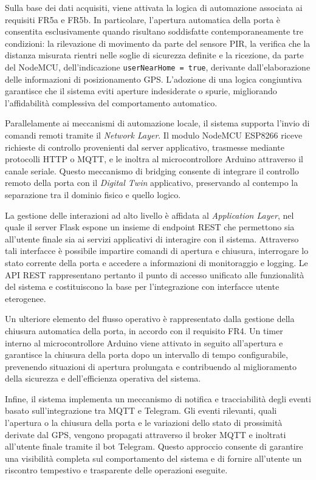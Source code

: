 Sulla base dei dati acquisiti, viene attivata la logica di automazione
associata ai requisiti FR5a e FR5b. In particolare, l’apertura automatica della
porta è consentita esclusivamente quando risultano soddisfatte
contemporaneamente tre condizioni: la rilevazione di movimento da parte del
sensore PIR, la verifica che la distanza misurata rientri nelle soglie di
sicurezza definite e la ricezione, da parte del NodeMCU, dell’indicazione
\texttt{userNearHome = true}, derivante dall’elaborazione delle informazioni di
posizionamento GPS. L’adozione di una logica congiuntiva garantisce che il
sistema eviti aperture indesiderate o spurie, migliorando l’affidabilità
complessiva del comportamento automatico.

Parallelamente ai meccanismi di automazione locale, il sistema supporta
l’invio di comandi remoti tramite il \textit{Network Layer}. Il modulo NodeMCU
ESP8266 riceve richieste di controllo provenienti dal server applicativo,
trasmesse mediante protocolli HTTP o MQTT, e le inoltra al microcontrollore
Arduino attraverso il canale seriale. Questo meccanismo di bridging consente di
integrare il controllo remoto della porta con il \textit{Digital Twin}
applicativo, preservando al contempo la separazione tra il dominio fisico e
quello logico.

La gestione delle interazioni ad alto livello è affidata al \textit{Application
Layer}, nel quale il server Flask espone un insieme di endpoint REST che
permettono sia all’utente finale sia ai servizi applicativi di interagire con il
sistema. Attraverso tali interfacce è possibile impartire comandi di
apertura e chiusura, interrogare lo stato corrente della porta e accedere a
informazioni di monitoraggio e logging. Le API REST rappresentano pertanto il
punto di accesso unificato alle funzionalità del sistema e costituiscono la
base per l’integrazione con interfacce utente eterogenee.

Un ulteriore elemento del flusso operativo è rappresentato dalla gestione
della chiusura automatica della porta, in accordo con il requisito FR4. Un
timer interno al microcontrollore Arduino viene attivato in seguito
all’apertura e garantisce la chiusura della porta dopo un intervallo di tempo
configurabile, prevenendo situazioni di apertura prolungata e contribuendo al
miglioramento della sicurezza e dell’efficienza operativa del sistema.

Infine, il sistema implementa un meccanismo di notifica e tracciabilità degli
eventi basato sull’integrazione tra MQTT e Telegram. Gli eventi rilevanti, quali
l’apertura o la chiusura della porta e le variazioni dello stato di prossimità
derivate dal GPS, vengono propagati attraverso il broker MQTT e inoltrati
all’utente finale tramite il bot Telegram. Questo approccio consente di
garantire una visibilità completa sul comportamento del sistema e di fornire
all’utente un riscontro tempestivo e trasparente delle operazioni eseguite.


